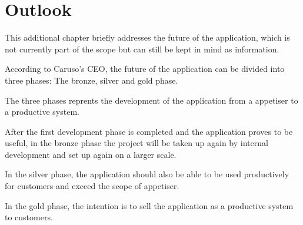 \chapter{Outlook}
This additional chapter briefly addresses the future of the application, which is not currently part of the scope but can still be kept in mind as information.

According to Caruso's CEO, the future of the application can be divided into three phases: The bronze, silver and gold phase.

The three phases reprents the development of the application from a \gls{appetiser} to a productive system.

After the first development phase is completed and the application proves to be useful, in the bronze phase the project will be taken up again by internal development and set up again on a larger scale.

In the silver phase, the application should also be able to be used productively for customers and exceed the scope of \gls{appetiser}.

In the gold phase, the intention is to sell the application as a productive system to customers.